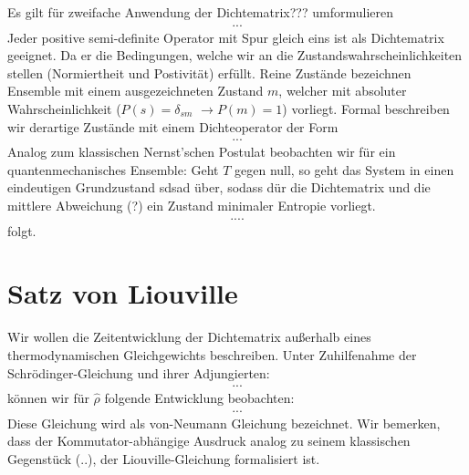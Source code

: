 Es gilt für zweifache Anwendung der Dichtematrix??? umformulieren
\begin{align*}
    ...
\end{align*}
Jeder positive semi-definite Operator mit Spur gleich eins ist als Dichtematrix geeignet. Da er die Bedingungen, welche wir an die Zustandswahrscheinlichkeiten stellen (Normiertheit und Postivität) erfüllt.
Reine Zustände bezeichnen Ensemble mit einem ausgezeichneten Zustand $m$, welcher mit absoluter Wahrscheinlichkeit ($P(s)=\delta_{sm}$ $\rightarrow P(m)=1$) vorliegt. Formal beschreiben wir derartige Zustände mit einem Dichteoperator der Form 
\begin{align*}
    ...
\end{align*}
Analog zum klassischen Nernst'schen Postulat beobachten wir für ein quantenmechanisches Ensemble: Geht $T$ gegen null, so geht das System in einen eindeutigen Grundzustand sdsad über, sodass dür die Dichtematrix und die mittlere Abweichung (?) ein Zustand minimaler Entropie vorliegt.
\begin{align*}
    ....
\end{align*}
folgt.
\section{Satz von Liouville}
Wir wollen die Zeitentwicklung der Dichtematrix außerhalb eines thermodynamischen Gleichgewichts beschreiben.
Unter Zuhilfenahme der Schrödinger-Gleichung und ihrer Adjungierten:
\begin{align*}
    ...
\end{align*}
können wir für $\widehat{\rho}$ folgende Entwicklung beobachten:
\begin{align*}
    ...
\end{align*}
Diese Gleichung wird als von-Neumann Gleichung bezeichnet. Wir bemerken, dass der Kommutator-abhängige Ausdruck analog zu seinem klassischen Gegenstück (..), der Liouville-Gleichung formalisiert ist.

